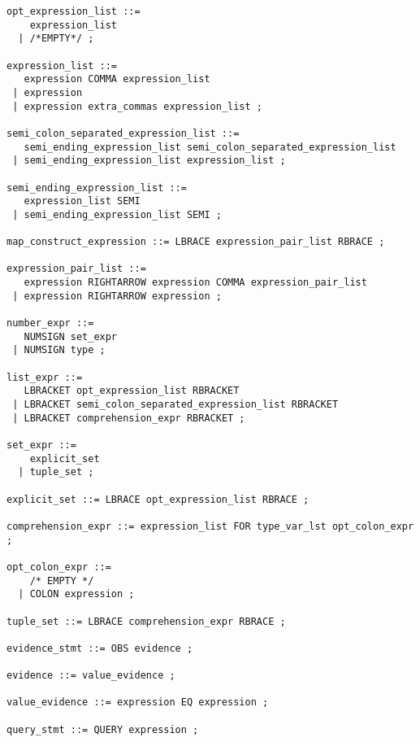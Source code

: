 \begin{verbatim}
opt_expression_list ::= 
    expression_list 
  | /*EMPTY*/ ;

expression_list ::= 
   expression COMMA expression_list
 | expression
 | expression extra_commas expression_list ;

semi_colon_separated_expression_list ::=
   semi_ending_expression_list semi_colon_separated_expression_list
 | semi_ending_expression_list expression_list ;

semi_ending_expression_list ::=
   expression_list SEMI
 | semi_ending_expression_list SEMI ;

map_construct_expression ::= LBRACE expression_pair_list RBRACE ;

expression_pair_list ::=
   expression RIGHTARROW expression COMMA expression_pair_list
 | expression RIGHTARROW expression ;
  
number_expr ::= 
   NUMSIGN set_expr
 | NUMSIGN type ;

list_expr ::= 
   LBRACKET opt_expression_list RBRACKET
 | LBRACKET semi_colon_separated_expression_list RBRACKET
 | LBRACKET comprehension_expr RBRACKET ;

set_expr ::= 
    explicit_set 
  | tuple_set ;

explicit_set ::= LBRACE opt_expression_list RBRACE ;

comprehension_expr ::= expression_list FOR type_var_lst opt_colon_expr ;

opt_colon_expr ::= 
    /* EMPTY */
  | COLON expression ;

tuple_set ::= LBRACE comprehension_expr RBRACE ;

evidence_stmt ::= OBS evidence ;

evidence ::= value_evidence ;

value_evidence ::= expression EQ expression ;

query_stmt ::= QUERY expression ;
\end{verbatim}

